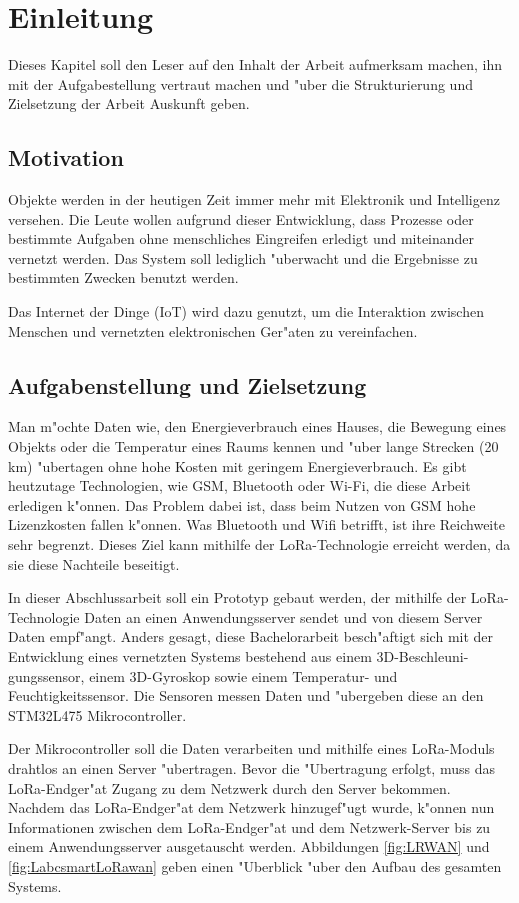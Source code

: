 
\chapter{Einleitung}

Dieses Kapitel soll den Leser auf den Inhalt der Arbeit 
aufmerksam machen, ihn mit der Aufgabestellung vertraut 
machen und "uber die Strukturierung und Zielsetzung der 
Arbeit Auskunft geben.


\section{Motivation}
Objekte werden in der heutigen Zeit immer mehr mit 
Elektronik und Intelligenz versehen. Die Leute wollen 
aufgrund dieser Entwicklung, dass Prozesse oder 
bestimmte Aufgaben ohne menschliches Eingreifen 
erledigt und miteinander vernetzt werden. Das System 
soll lediglich "uberwacht und die Ergebnisse zu 
bestimmten Zwecken benutzt werden.

Das Internet der Dinge (\ac{IoT}) wird dazu genutzt, um 
die Interaktion zwischen Menschen und vernetzten 
elektronischen Ger"aten zu vereinfachen. 


\section{Aufgabenstellung und Zielsetzung}
Man m"ochte Daten wie, den Energieverbrauch eines Hauses, 
die Bewegung eines Objekts oder die Temperatur eines Raums 
kennen und "uber lange Strecken (20 km) "ubertagen ohne 
hohe Kosten mit  geringem Energieverbrauch. Es gibt 
heutzutage Technologien, wie \ac{GSM}, Bluetooth oder Wi-Fi, 
die diese Arbeit erledigen k"onnen. Das Problem dabei 
ist, dass beim Nutzen von GSM hohe Lizenzkosten 
fallen k"onnen. Was Bluetooth und Wifi betrifft, ist 
ihre Reichweite sehr begrenzt. Dieses Ziel kann mithilfe 
der LoRa-Technologie erreicht werden, da sie diese 
Nachteile beseitigt.  

In dieser Abschlussarbeit soll ein Prototyp gebaut 
werden, der mithilfe der LoRa-Technologie Daten an 
einen Anwendungsserver sendet und von diesem Server Daten 
empf"angt. Anders gesagt, diese Bachelorarbeit 
besch"aftigt sich mit der Entwicklung eines vernetzten 
Systems bestehend aus einem 3D-Beschleuni-gungssensor, 
einem 3D-Gyroskop sowie einem Tem\-peratur- und 
Feuchtigkeitssensor. Die Sensoren messen Daten und 
"ubergeben diese an den STM32L475 Mikrocontroller.

Der Mikrocontroller soll die Daten verarbeiten und mithilfe eines 
LoRa-Moduls \cite{AT_Command} drahtlos an 
einen Server "ubertragen. Bevor die "Ubertragung 
erfolgt, muss das LoRa-Endger"at Zugang zu dem Netzwerk 
durch den Server bekommen. Nachdem das LoRa-Endger"at 
dem Netzwerk hinzugef"ugt wurde, k"onnen nun 
Informationen zwischen dem LoRa-Endger"at und dem 
Netzwerk-Server bis zu einem Anwendungsserver 
ausgetauscht werden. Abbildungen \ref{fig:LRWAN} und 
\ref{fig:LabcsmartLoRawan} geben einen "Uberblick "uber 
den Aufbau des gesamten Systems.

